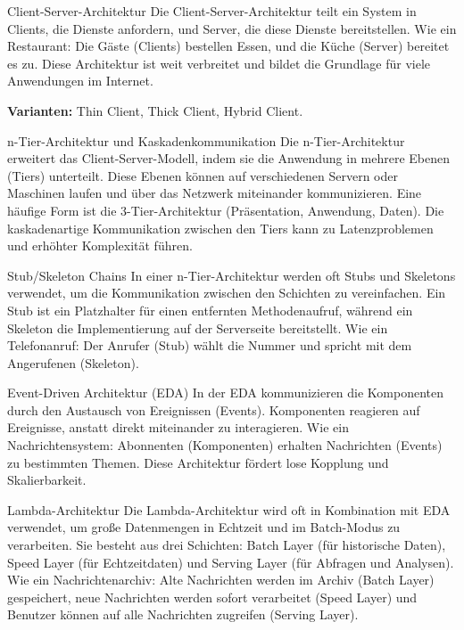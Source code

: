\documentclass{beamer}
\begin{document}
\begin{frame}{Client-Server-Architektur}
    Die Client-Server-Architektur teilt ein System in Clients, die Dienste anfordern, und Server, die diese Dienste bereitstellen.  Wie ein Restaurant:  Die Gäste (Clients) bestellen Essen, und die Küche (Server) bereitet es zu.  Diese Architektur ist weit verbreitet und bildet die Grundlage für viele Anwendungen im Internet.

    \textbf{Varianten:} Thin Client, Thick Client, Hybrid Client.
\end{frame}

\begin{frame}{n-Tier-Architektur und Kaskadenkommunikation}
    Die n-Tier-Architektur erweitert das Client-Server-Modell, indem sie die Anwendung in mehrere Ebenen (Tiers) unterteilt. Diese Ebenen können auf verschiedenen Servern oder Maschinen laufen und über das Netzwerk miteinander kommunizieren. Eine häufige Form ist die 3-Tier-Architektur (Präsentation, Anwendung, Daten).  Die kaskadenartige Kommunikation zwischen den Tiers kann zu Latenzproblemen und erhöhter Komplexität führen.
\end{frame}


\begin{frame}{Stub/Skeleton Chains}
    In einer n-Tier-Architektur werden oft Stubs und Skeletons verwendet, um die Kommunikation zwischen den Schichten zu vereinfachen. Ein Stub ist ein Platzhalter für einen entfernten Methodenaufruf, während ein Skeleton die Implementierung auf der Serverseite bereitstellt.  Wie ein Telefonanruf:  Der Anrufer (Stub) wählt die Nummer und spricht mit dem Angerufenen (Skeleton).
\end{frame}


\begin{frame}{Event-Driven Architektur (EDA)}
    In der EDA kommunizieren die Komponenten durch den Austausch von Ereignissen (Events). Komponenten reagieren auf Ereignisse, anstatt direkt miteinander zu interagieren.  Wie ein Nachrichtensystem:  Abonnenten (Komponenten) erhalten Nachrichten (Events) zu bestimmten Themen.  Diese Architektur fördert lose Kopplung und Skalierbarkeit.
\end{frame}

\begin{frame}{Lambda-Architektur}
    Die Lambda-Architektur wird oft in Kombination mit EDA verwendet, um große Datenmengen in Echtzeit und im Batch-Modus zu verarbeiten.  Sie besteht aus drei Schichten: Batch Layer (für historische Daten), Speed Layer (für Echtzeitdaten) und Serving Layer (für Abfragen und Analysen).  Wie ein Nachrichtenarchiv:  Alte Nachrichten werden im Archiv (Batch Layer) gespeichert, neue Nachrichten werden sofort verarbeitet (Speed Layer) und Benutzer können auf alle Nachrichten zugreifen (Serving Layer).
\end{frame}
\end{document}
